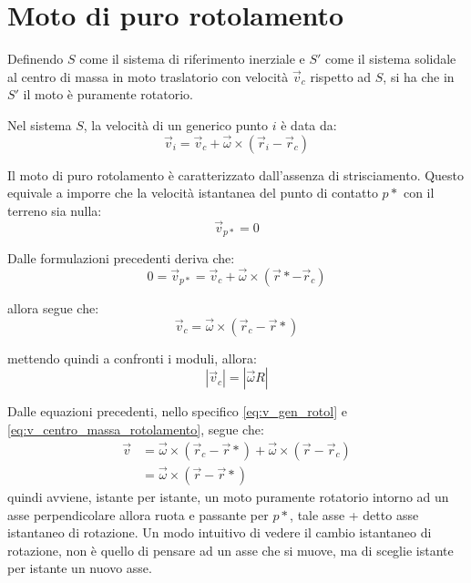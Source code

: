\documentclass[11pt, a4paper, openright]{book}
\theoremstyle{plain}
\theoremstyle{definition}
\begin{document}
\section{Moto di puro rotolamento}
Definendo $S$ come il sistema di riferimento inerziale e $S'$ come il sistema solidale al centro di massa in moto traslatorio con velocità $\vec{v}_c$ rispetto ad $S$, si ha che in $S'$ il moto è puramente rotatorio.

Nel sistema $S$, la velocità di un generico punto $i$ è data da:
\begin{equation}
    \vec{v}_i = \vec{v}_c + \vec{\omega} \times (\vec{r}_i - \vec{r}_c)
    \label{eq:v_gen_rotol}
\end{equation}

Il moto di puro rotolamento è caratterizzato dall'assenza di strisciamento. 
Questo equivale a imporre che la velocità istantanea del punto di contatto $p*$ con il terreno sia nulla:
\begin{equation}
    \vec{v}_{p*} = 0
\end{equation}

Dalle formulazioni precedenti deriva che:
\begin{equation}
    0 = \vec{v}_{p*} = \vec{v}_c + \vec{\omega} \times (\vec{r}* - \vec{r}_c)
\end{equation}

allora segue che:
\begin{equation}
    \vec{v}_c = \vec{\omega} \times (\vec{r}_c - \vec{r}*)
    \label{eq:v_centro_massa_rotolamento}
\end{equation}

mettendo quindi a confronti i moduli, allora:
\begin{equation}
    |\vec{v}_c| = |\vec{\omega}R|
\end{equation}

Dalle equazioni precedenti, nello specifico \ref{eq:v_gen_rotol} e \ref{eq:v_centro_massa_rotolamento}, segue che:
\begin{align}
    \vec{v} & = \vec{\omega} \times (\vec{r}_c - \vec{r}*) + \vec{\omega} \times (\vec{r} - \vec{r}_c) \\ 
    & = \vec{\omega} \times (\vec{r} - \vec{r}*)
\end{align}
quindi avviene, istante per istante, un moto puramente rotatorio intorno ad un asse perpendicolare allora ruota e passante per $p*$, tale asse + detto asse istantaneo di rotazione.
Un modo intuitivo di vedere il cambio istantaneo di rotazione, non è quello di pensare ad un asse che si muove, ma di sceglie istante per istante un nuovo asse.   
\end{document}
